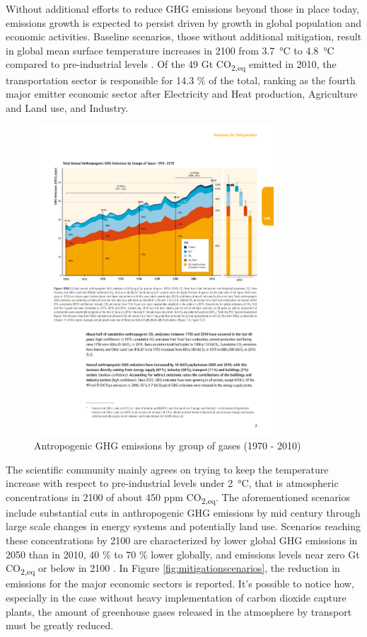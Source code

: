 \documentclass[12pt]{report}   %
\begin{document}
Without additional efforts to reduce GHG emissions beyond those in place today, emissions growth is expected to persist driven by growth in global population and economic activities. Baseline scenarios, those without additional mitigation, result in global mean surface temperature increases in 2100 from \SI{3.7}{\celsius}  to \SI{4.8}{\celsius}  compared to pre-industrial levels \cite{IPCC2014}. Of the 49 Gt CO\textsubscript{2,eq} emitted in 2010, the transportation sector is responsible for 14.3 \% of the total, ranking as the fourth major emitter economic sector after Electricity and Heat production, Agriculture and Land use, and Industry.

\begin{figure}[h]
  \centering
\includegraphics[width=0.8\textwidth]{figures/introduction/antropogenic_ghg_emissions.pdf}
  \caption{Antropogenic GHG emissions by group of gases (1970 - 2010) \cite{IPCC2014}}
  \label{antropogenic_ghg_emissions}
\end{figure}

The scientific community mainly agrees on trying to keep the temperature increase with respect to pre-industrial levels under \SI{2}{\celsius}, that is atmospheric concentrations in 2100 of about 450 ppm CO\textsubscript{2,eq}. The aforementioned scenarios include substantial cuts in anthropogenic GHG emissions by mid century through large scale changes in energy systems and potentially land use. Scenarios reaching these concentrations by 2100 are characterized by lower global GHG emissions in 2050 than in 2010, 40 \% to 70 \% lower globally, and emissions levels near zero Gt CO\textsubscript{2,eq} or below in 2100 \cite{IPCC2014}. In Figure \ref{fig:mitigationscenarios}, the reduction in emissions for the major economic sectors is reported. It's possible to notice how, especially in the case without heavy implementation of carbon dioxide capture plants, the amount of greenhouse gases released in the atmosphere by transport must be greatly reduced.
\end{document}
